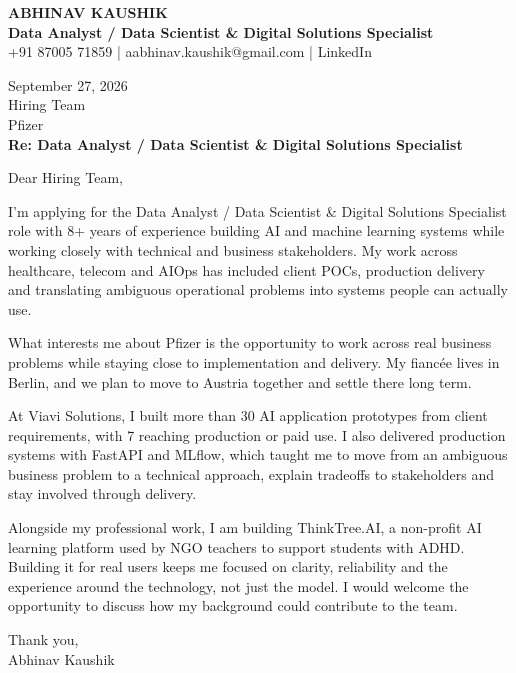 \documentclass[10pt,a4paper]{article}
\begin{document}
\begin{center}
{\Large\bfseries ABHINAV KAUSHIK}\\[2pt]
{\bfseries Data Analyst / Data Scientist \& Digital Solutions Specialist}\\[2pt]
+91 87005 71859 \quad | \quad aabhinav.kaushik@gmail.com \quad | \quad LinkedIn
\end{center}
\vspace{8pt}
September 27, 2026\\[6pt]
Hiring Team\\
Pfizer\\[4pt]
\textbf{Re: Data Analyst / Data Scientist \& Digital Solutions Specialist}

Dear Hiring Team,

I’m applying for the Data Analyst / Data Scientist \& Digital Solutions Specialist role with 8+ years of experience building AI and machine learning systems while working closely with technical and business stakeholders. My work across healthcare, telecom and AIOps has included client POCs, production delivery and translating ambiguous operational problems into systems people can actually use.

What interests me about Pfizer is the opportunity to work across real business problems while staying close to implementation and delivery. My fiancée lives in Berlin, and we plan to move to Austria together and settle there long term.

At Viavi Solutions, I built more than 30 AI application prototypes from client requirements, with 7 reaching production or paid use. I also delivered production systems with FastAPI and MLflow, which taught me to move from an ambiguous business problem to a technical approach, explain tradeoffs to stakeholders and stay involved through delivery.

Alongside my professional work, I am building ThinkTree.AI, a non-profit AI learning platform used by NGO teachers to support students with ADHD. Building it for real users keeps me focused on clarity, reliability and the experience around the technology, not just the model. I would welcome the opportunity to discuss how my background could contribute to the team.

Thank you,\\
Abhinav Kaushik
\end{document}
